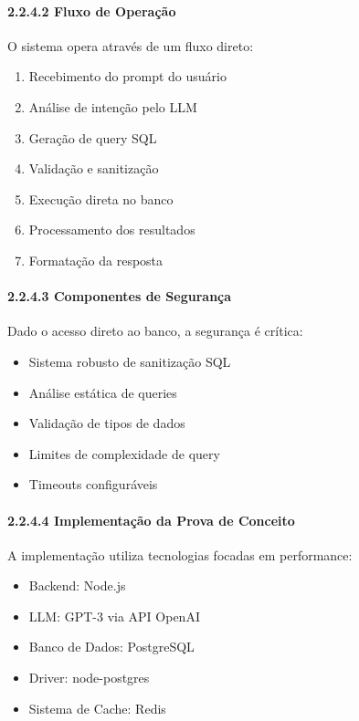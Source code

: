 \documentclass[
]{article}
\providecommand{\tightlist}{%
  \setlength{\itemsep}{0pt}\setlength{\parskip}{0pt}}
\begin{document}
\paragraph{2.2.4.2 Fluxo de Operação}\label{fluxo-de-operauxe7uxe3o-1}

O sistema opera através de um fluxo direto:

\begin{enumerate}
\def\labelenumi{\arabic{enumi}.}
\tightlist
\item
  Recebimento do prompt do usuário
\item
  Análise de intenção pelo LLM
\item
  Geração de query SQL
\item
  Validação e sanitização
\item
  Execução direta no banco
\item
  Processamento dos resultados
\item
  Formatação da resposta
\end{enumerate}

\paragraph{2.2.4.3 Componentes de
Segurança}\label{componentes-de-seguranuxe7a-2}

Dado o acesso direto ao banco, a segurança é crítica:

\begin{itemize}
\tightlist
\item
  Sistema robusto de sanitização SQL
\item
  Análise estática de queries
\item
  Validação de tipos de dados
\item
  Limites de complexidade de query
\item
  Timeouts configuráveis
\end{itemize}

\paragraph{2.2.4.4 Implementação da Prova de
Conceito}\label{implementauxe7uxe3o-da-prova-de-conceito-2}

A implementação utiliza tecnologias focadas em performance:

\begin{itemize}
\tightlist
\item
  Backend: Node.js
\item
  LLM: GPT-3 via API OpenAI
\item
  Banco de Dados: PostgreSQL
\item
  Driver: node-postgres
\item
  Sistema de Cache: Redis
\end{itemize}
\end{document}

